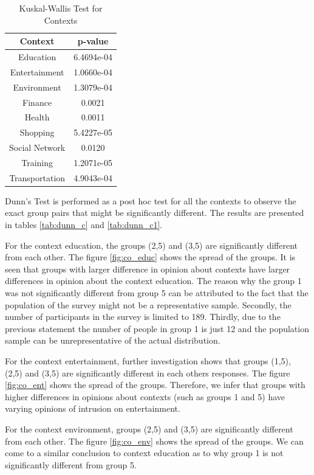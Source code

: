 \begin{table}[h!]
  \centering
  \caption{Kuskal-Wallis Test for Contexts}
  \label{tab:kw_c}
  \begin{tabular}{cc}
    \toprule
     Context & p-value \\
    \midrule
    Education &  6.4694e-04 \\
    Entertainment & 1.0660e-04\\
    Environment & 1.3079e-04\\
    Finance & 0.0021\\ 
    Health & 0.0011\\
    Shopping & 5.4227e-05\\ 
    Social Network &  0.0120\\
    Training & 1.2071e-05\\
    Transportation & 4.9043e-04\\ 
    \bottomrule
  \end{tabular}
\end{table} 

Dunn's Test is performed as a post hoc test for all the contexts to observe the exact group pairs that might be significantly different. The results are presented in tables \ref{tab:dunn_c} and \ref{tab:dunn_c1}. 

For the context education, the groups (2,5) and (3,5) are significantly different from each other. The figure \ref{fig:co_educ} shows the spread of the groups. It is seen that groups with larger difference in opinion about contexts have larger differences in opinion about the context education. The reason why the group 1 was not significantly different from group 5 can be attributed to the fact that the population of the survey might not be a representative sample. Secondly, the number of participants in the survey is limited to 189. Thirdly, due to the previous statement the number of people in group 1 is just 12 and the population sample can be unrepresentative of the actual distribution.

For the context entertainment, further investigation shows that groups (1,5), (2,5) and (3,5) are significantly different in each others responses. The figure \ref{fig:co_ent} shows the spread of the groups. Therefore, we infer that groups with higher differences in opinions about contexts (such as groups 1 and 5) have varying opinions of intrusion on entertainment.

For the context environment, groups (2,5) and (3,5) are significantly different from each other. The figure \ref{fig:co_env} shows the spread of the groups. We can come to a similar conclusion to context education as to why group 1 is not significantly different from group 5.

